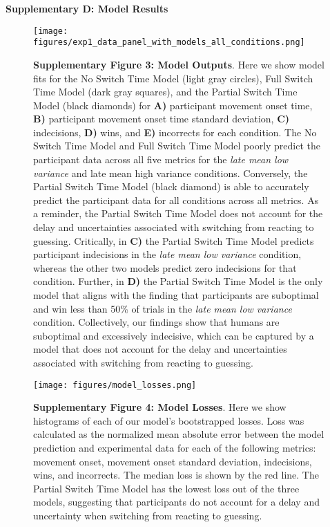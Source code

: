 \documentclass[12pt]{article}
\newcommand\boldblue[1]{\textcolor{mydarkblue}{\textbf{#1}}}
\begin{document}
\newpage
\noindent\boldblue{\large\textcolor{mydarkblue}{Supplementary D: Model Results}}

\begin{figure}[H]
    \begin{minipage}[c]{0.6\textwidth}
        \texttt{[image: figures/exp1\_data\_panel\_with\_models\_all\_conditions.png]}
    \end{minipage}\hfill
    \begin{minipage}[c]{0.3\textwidth}
        \caption*{
            \boldblue{Supplementary Figure 3: Model Outputs}. Here we show model fits for the No Switch Time Model (light gray circles), Full Switch Time Model (dark gray squares), and the Partial Switch Time Model (black diamonds) for \boldblue{A)} participant movement onset time, \boldblue{B)} participant movement onset time standard deviation, \boldblue{C)} indecisions, \boldblue{D)} wins, and \boldblue{E)} incorrects for each condition. The No Switch Time Model and Full Switch Time Model poorly predict the participant data across all five metrics for the \emph{late mean low variance} and late mean high variance conditions. Conversely, the Partial Switch Time Model (black diamond) is able to accurately predict the participant data for all conditions across all metrics. As a reminder, the Partial Switch Time Model does not account for the delay and uncertainties associated with switching from reacting to guessing. Critically, in \boldblue{C)} the Partial Switch Time Model predicts participant indecisions in the \emph{late mean low variance} condition, whereas the other two models predict zero indecisions for that condition. Further, in \boldblue{D)} the Partial Switch Time Model is the only model that aligns with the finding that participants are suboptimal and win less than 50\% of trials in the \emph{late mean low variance} condition. Collectively, our findings show that humans are suboptimal and excessively indecisive, which can be captured by a model that does not account  for the delay and uncertainties associated with switching from reacting to guessing.
        } 
    \end{minipage}
\end{figure}

\begin{figure}[H]
    \centering 
    \texttt{[image: figures/model\_losses.png]}

        \caption*{
            \boldblue{Supplementary Figure 4: Model Losses}. Here we show histograms of each of our model’s bootstrapped losses. Loss was calculated as the normalized mean absolute error between the model prediction and experimental data for each of the following metrics: movement onset, movement onset standard deviation, indecisions, wins, and incorrects. The median loss is shown by the red line. The Partial Switch Time Model has the lowest loss out of the three models, suggesting that participants do not account for a delay and uncertainty when switching from reacting to guessing. 
        } 
\end{figure}
\end{document}
